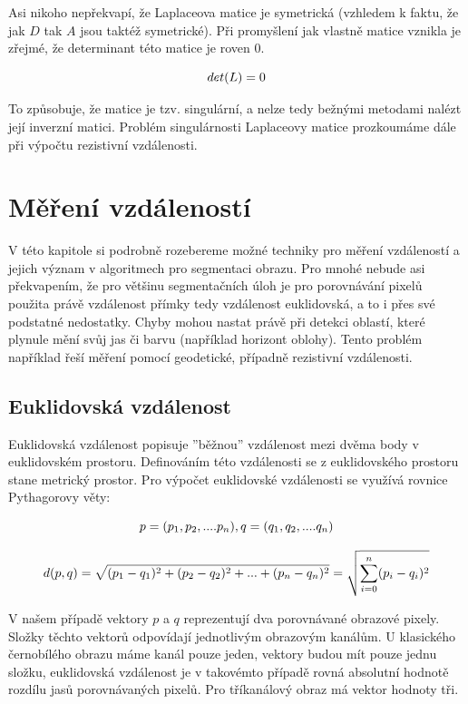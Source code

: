 \documentclass[czech, master, public, dept460, male, cpdeclaration, oneside]{diploma}
\begin{document}
\noindent
Asi nikoho nepřekvapí, že Laplaceova matice je symetrická (vzhledem k faktu, že jak $D$ tak $A$ jsou taktéž symetrické). Při promyšlení jak vlastně matice vznikla je zřejmé, že determinant této matice je roven 0.

\begin{equation}
\vspace*{+3.0mm}
det(L) = 0
\end{equation}

\noindent
To způsobuje, že matice je tzv. singulární, a nelze tedy bežnými metodami nalézt její inverzní matici. Problém singulárnosti Laplaceovy matice prozkoumáme dále při výpočtu rezistivní vzdálenosti. 

\section{Měření vzdáleností}
V této kapitole si podrobně rozebereme možné techniky pro měření vzdáleností a jejich význam v algoritmech pro segmentaci obrazu. Pro mnohé nebude asi překvapením, že pro většinu segmentačních úloh je pro porovnávání pixelů použita právě vzdálenost přímky tedy vzdálenost euklidovská, a to i přes své podstatné nedostatky. Chyby mohou nastat právě při detekci oblastí, které plynule mění svůj jas či barvu (například horizont oblohy). Tento problém například řeší měření pomocí geodetické, případně rezistivní vzdálenosti.


\subsection{Euklidovská vzdálenost}
Euklidovská vzdálenost popisuje ''běžnou'' vzdálenost mezi dvěma body v euklidovském prostoru. Definováním této vzdálenosti se z euklidovského prostoru stane metrický prostor. Pro výpočet euklidovské vzdálenosti se využívá rovnice Pythagorovy věty:

\begin{equation}
\vspace*{+3.0mm}
p = (p_1, p_2, .... p_n), q = (q_1, q_2, .... q_n)
\end{equation}

\begin{equation}
\vspace*{+3.0mm}
d(p,q) = \sqrt{(p_1 - q_1)^2 + (p_2 - q_2)^2 + ... + (p_n - q_n)^2} = \sqrt{\sum_{i = 0}^{n} (p_i - q_i)^2 }
\end{equation}

\noindent
V našem případě vektory $p$ a $q$ reprezentují dva porovnávané obrazové pixely. Složky těchto vektorů odpovídají jednotlivým obrazovým kanálům. U klasického černobílého obrazu máme kanál pouze jeden, vektory budou mít pouze jednu složku, euklidovská vzdálenost je v takovémto případě rovná absolutní hodnotě rozdílu jasů porovnávaných pixelů. Pro tříkanálový obraz má vektor hodnoty tři.
\end{document}
